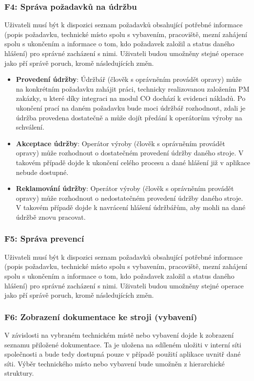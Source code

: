 \documentclass[thesis=M,czech]{FITthesis}[2012/06/26]
\begin{document}
\subsubsection{F4: Správa požadavků na údržbu}
Uživateli musí být k dispozici seznam požadavků obsahující potřebné informace (popis požadavku, technické místo spolu s vybavením, pracoviště, mezní zahájení spolu s ukončením a informace o tom, kdo požadavek založil a status daného hlášení) pro správné zacházení s nimi. Uživateli budou umožněny stejné operace jako pří správě poruch, kromě následujících změn.
\begin{itemize}
	\item
	\textbf{Provedení údržby}: Údržbář (člověk s oprávněním provádět opravy) může na konkrétním požadavku zahájit práci, technicky realizovanou založením PM zakázky, u které díky integraci na modul CO dochází k evidenci nákladů. Po ukončení prací na daném požadavku bude moci údržbář rozhodnout, zdali je údržba provedena dostatečně a může dojít předání k operátorům výroby na schválení. 
	\item
	\textbf{Akceptace údržby}: Operátor výroby (člověk s oprávněním provádět opravy) může rozhodnout o dostatečném provedení údržby daného stroje. V takovém případě dojde k ukončení celého procesu a dané hlášení již v aplikace nebude dostupné.
	\item
	\textbf{Reklamování údržby}: Operátor výroby (člověk s oprávněním provádět opravy) může rozhodnout o nedostatečném provedení údržby daného stroje. V takovém případě dojde k navrácení hlášení údržbářům, aby mohli na dané údržbě znovu pracovat.
\end{itemize} 

\subsubsection{F5: Správa prevencí}
Uživateli musí být k dispozici seznam požadavků obsahující potřebné informace (popis požadavku, technické místo spolu s vybavením, pracoviště, mezní zahájení spolu s ukončením a informace o tom, kdo požadavek založil a status daného hlášení) pro správné zacházení s nimi. Uživateli budou umožněny stejné operace jako pří správě poruch, kromě následujících změn.

\subsubsection{F6: Zobrazení dokumentace ke stroji (vybavení)}
V závislosti na vybraném technickém místě nebo vybavení dojde k zobrazení seznamu přiložené dokumentace. Ta je uložena na sdíleném uložiti v interní síti společnosti a bude tedy dostupná pouze v případě použití aplikace uvnitř dané síti. Výběr technického místo nebo vybavení bude umožněn z hierarchické struktury.
\end{document}
